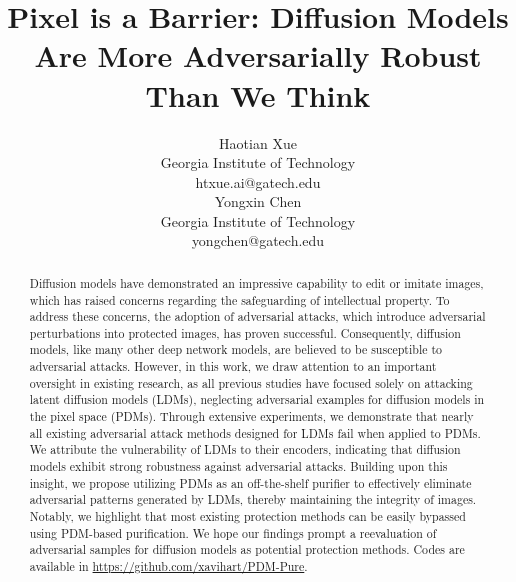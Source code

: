 \documentclass{article}
\title{Pixel is a Barrier: Diffusion Models Are More Adversarially Robust Than We Think}
\author{%
  Haotian Xue \\
  Georgia Institute of Technology\\
  htxue.ai@gatech.edu\\
  \And
   Yongxin Chen\\
  Georgia Institute of Technology\\
  yongchen@gatech.edu\\
}
\begin{document}
\maketitle


\begin{abstract}


Diffusion models have demonstrated an impressive capability to edit or imitate images, which has raised concerns regarding the safeguarding of intellectual property. To address these concerns, the adoption of adversarial attacks, which introduce adversarial perturbations into protected images, has proven successful. Consequently, diffusion models, like many other deep network models, are believed to be susceptible to adversarial attacks. However, in this work, we draw attention to an important oversight in existing research, as all previous studies have focused solely on attacking latent diffusion models (LDMs), neglecting adversarial examples for diffusion models in the pixel space (PDMs). Through extensive experiments, we demonstrate that nearly all existing adversarial attack methods designed for LDMs fail when applied to PDMs. We attribute the vulnerability of LDMs to their encoders, indicating that diffusion models exhibit strong robustness against adversarial attacks. Building upon this insight, we propose utilizing PDMs as an off-the-shelf purifier to effectively eliminate adversarial patterns generated by LDMs, thereby maintaining the integrity of images. Notably, we highlight that most existing protection methods can be easily bypassed using PDM-based purification. We hope our findings prompt a reevaluation of adversarial samples for diffusion models as potential protection methods. Codes are available in \url{https://github.com/xavihart/PDM-Pure}.



\end{abstract}
\end{document}
